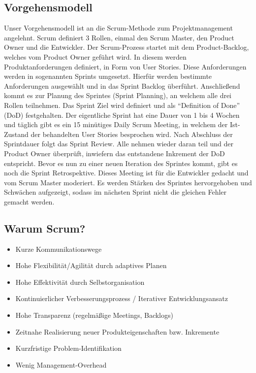 \documentclass[a4paper,11pt]{scrartcl}
\begin{document}
\subsection{Vorgehensmodell}
Unser Vorgehensmodell ist an die Scrum-Methode zum Projektmanagement angelehnt.
Scrum definiert 3 Rollen, einmal den Scrum Master, den Product Owner und die Entwickler.
Der Scrum-Prozess startet mit dem Product-Backlog, welches vom Product Owner geführt wird.
In diesem werden Produktanforderungen definiert, in Form von User Stories.
Diese Anforderungen werden in sogenannten Sprints umgesetzt.
Hierfür werden bestimmte Anforderungen ausgewählt und in das Sprint Backlog überführt.
Anschließend kommt es zur Planung des Sprintes (Sprint Planning),
an welchem alle drei Rollen teilnehmen. Das Sprint Ziel wird definiert und
als "`Definition of Done"' (DoD) festgehalten.
Der eigentliche Sprint hat eine Dauer von 1 bis 4 Wochen und täglich gibt es ein 15 minütiges Daily Scrum Meeting,
in welchem der Ist-Zustand der behandelten User Stories besprochen wird.
Nach Abschluss der Sprintdauer folgt das Sprint Review.
Alle nehmen wieder daran teil und der Product Owner überprüft,
inwiefern das entstandene Inkrement der DoD entspricht.
Bevor es nun zu einer neuen Iteration des Sprintes kommt,
gibt es noch die Sprint Retrospektive.
Dieses Meeting ist für die Entwickler gedacht und vom Scrum Master moderiert.
Es werden Stärken des Sprintes hervorgehoben und Schwächen aufgezeigt,
sodass im nächsten Sprint nicht die gleichen Fehler gemacht werden.

\subsection{Warum Scrum?}
\begin{itemize}
\item Kurze Kommunikationswege
\item Hohe Flexibilität/Agilität durch adaptives Planen
\item Hohe Effektivität durch Selbstorganisation
\item Kontinuierlicher Verbesserungsprozess / Iterativer Entwicklungsansatz
\item Hohe Transparenz (regelmäßige Meetings, Backlogs)
\item Zeitnahe Realisierung neuer Produkteigenschaften bzw. Inkremente
\item Kurzfristige Problem-Identifikation
\item Wenig Management-Overhead
\end{itemize}
\end{document}
